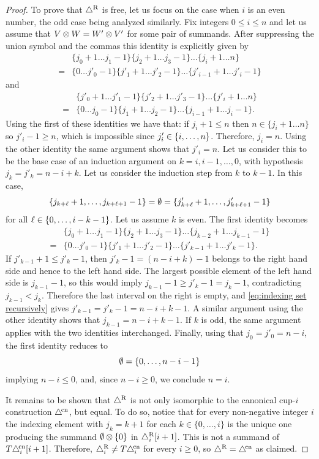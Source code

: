 \begin{proof}
	To prove that $\triangle^{\mathrm{R}}$ is free, let us focus on the case when $i$ is an even number, the odd case being analyzed similarly.
	Fix integers $0 \leq i \leq n$ and let us assume that $V \otimes W = W' \otimes V'$ for some pair of summands.
	After suppressing the union symbol and the commas this identity is explicitly given by
	\begin{align*}
		&\{j_0+1 \dots j_1-1\} \{j_2+1 \dots j_3-1\} \dots \{j_i+1 \dots n\} \\=
		&\{0 \dots j'_0-1\} \{j'_1+1 \dots j'_2-1\} \dots \{j'_{i-1}+1 \dots j'_i-1\}
	\end{align*}
	and
	\begin{align*}
		&\{j'_0+1 \dots j'_1-1\} \{j'_2+1 \dots j'_3-1\} \dots \{j'_i+1 \dots n\} \\=
		&\{0 \dots j_0-1\} \{j_1+1 \dots j_2-1\} \dots \{j_{i-1}+1 \dots j_i-1\}.
	\end{align*}
	Using the first of these identities we have that: if $j_i+1 \leq n$ then $n \in \{j_i+1 \dots n\}$ so $j'_i-1 \geq n$, which is impossible since $j'_i \in \{i,\dots,n\}$.
	Therefore, $j_i = n$.
	Using the other identity the same argument shows that $j'_i = n$.
	Let us consider this to be the base case of an induction argument on $k = i,i-1,\dots,0$, with hypothesis $j_k = j'_k = n-i+k$.
	Let us consider the induction step from $k$ to $k-1$.
	In this case,
	\[
	\{j_{k+\ell}+1,\dots,j_{k+\ell+1}-1\} = \emptyset = \{j'_{k+\ell}+1,\dots,j'_{k+\ell+1}-1\}
	\]
	for all $\ell \in \{0,\dots,i-k-1\}$.
	Let us assume $k$ is even.
	The first identity becomes
	\begin{align*}
		&\{j_0+1 \dots j_1-1\} \{j_2+1 \dots j_3-1\} \dots \{j_{k-2}+1 \dots j_{k-1}-1\} \\=
		&\{0 \dots j'_0-1\} \{j'_1+1 \dots j'_2-1\} \dots \{j'_{k-1}+1 \dots j'_k-1\}.
	\end{align*}
	If $j'_{k-1}+1 \leq j'_k-1$, then $j'_k - 1 = (n-i+k) - 1$ belongs to the right hand side and hence to the left hand side.
	The largest possible element of the left hand side is $j_{k-1}-1$, so this would imply $j_{k-1}-1\geq j'_k-1=j_k-1$, contradicting $j_{k-1}<j_k$.
	Therefore the last interval on the right is empty, and \cref{eq:indexing set recursively} gives $j'_{k-1}=j'_k-1=n-i+k-1$.
	A similar argument using the other identity shows that $j_{k-1} = n-i+k-1$.
	If $k$ is odd, the same argument applies with the two identities interchanged.
	Finally, using that $j_0 = j'_0 = n-i$, the first identity reduces to
	\[
	\emptyset = \{0,\dots, n-i-1\}
	\]
	implying $n-i \leq 0$, and, since $n-i \geq 0$, we conclude $n=i$.

	It remains to be shown that $\triangle^{\mathrm{R}}$ is not only isomorphic to the canonical \mbox{cup-$i$} construction $\triangle^{\!\mathrm{cn}}$, but equal.
	To do so, notice that for every non-negative integer $i$ the indexing element with $j_k = k+1$ for each $k \in \{0,\dots,i\}$ is the unique one producing the summand $\emptyset \otimes \{0\}$ in $\triangle_i^{\mathrm{R}}[i+1]$.
	This is not a summand of $T \triangle^{\!\mathrm{cn}}_i[i+1]$.
	Therefore, $\triangle_i^{\mathrm{R}} \neq T \triangle^{\!\mathrm{cn}}_i$ for every $i \geq 0$, so $\triangle^{\mathrm{R}} = \triangle^{\!\mathrm{cn}}$ as claimed.
\end{proof}
